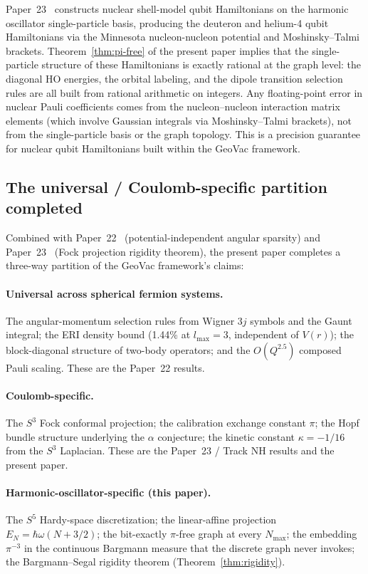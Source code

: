 \documentclass[twocolumn,pra,amsmath,amssymb,superscriptaddress]{revtex4-2}
\begin{document}
Paper~23~\cite{paper23} constructs nuclear shell-model qubit
Hamiltonians on the harmonic oscillator single-particle basis,
producing the deuteron and helium-4 qubit Hamiltonians via the
Minnesota nucleon-nucleon potential and Moshinsky--Talmi
brackets.  Theorem~\ref{thm:pi-free} of the present paper
implies that the single-particle structure of these Hamiltonians
is exactly rational at the graph level: the diagonal HO
energies, the orbital labeling, and the dipole transition
selection rules are all built from rational arithmetic on
integers.  Any floating-point error in nuclear Pauli coefficients
comes from the nucleon--nucleon interaction matrix elements
(which involve Gaussian integrals via Moshinsky--Talmi brackets),
not from the single-particle basis or the graph topology.  This
is a precision guarantee for nuclear qubit Hamiltonians built
within the GeoVac framework.

\subsection{The universal / Coulomb-specific partition completed}
\label{sec:partition}

Combined with Paper~22~\cite{paper22} (potential-independent
angular sparsity) and Paper~23~\cite{paper23} (Fock projection
rigidity theorem), the present paper completes a three-way
partition of the GeoVac framework's claims:

\paragraph{Universal across spherical fermion systems.}
The angular-momentum selection rules from Wigner $3j$ symbols
and the Gaunt integral; the ERI density bound (1.44\% at
$l_{\max} = 3$, independent of $V(r)$); the block-diagonal
structure of two-body operators; and the $O(Q^{2.5})$ composed
Pauli scaling.  These are the Paper~22 results.

\paragraph{Coulomb-specific.}
The $S^3$ Fock conformal projection; the calibration exchange
constant $\pi$; the Hopf bundle structure underlying the
$\alpha$ conjecture; the kinetic constant $\kappa = -1/16$ from
the $S^3$ Laplacian.  These are the Paper~23 / Track NH results
and the present paper.

\paragraph{Harmonic-oscillator-specific (this paper).}
The $S^5$ Hardy-space discretization; the linear-affine
projection $E_N = \hbar\omega(N + 3/2)$; the bit-exactly
$\pi$-free graph at every $N_{\max}$; the embedding $\pi^{-3}$
in the continuous Bargmann measure that the discrete graph
never invokes; the Bargmann--Segal rigidity theorem
(Theorem~\ref{thm:rigidity}).
\end{document}
